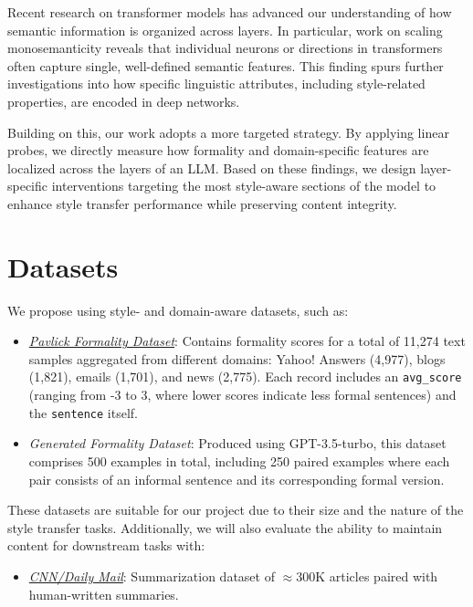 \documentclass[twocolumn]{article}
\begin{document}
Recent research on transformer models has advanced our understanding of how semantic information is organized across layers. In particular, work on scaling monosemanticity \citep{monosemanticity2024} reveals that individual neurons or directions in transformers often capture single, well-defined semantic features. This finding spurs further investigations into how specific linguistic attributes, including style-related properties, are encoded in deep networks.

Building on this, our work adopts a more targeted strategy. By applying linear probes, we directly measure how formality and domain-specific features are localized across the layers of an LLM. Based on these findings, we design layer-specific interventions targeting the most style-aware sections of the model to enhance style transfer performance while preserving content integrity.

\section{Datasets}

We propose using style- and domain-aware datasets, such as:

\begin{itemize}
    \item \href{https://huggingface.co/datasets/osyvokon/pavlick-formality-scores}{\textit{Pavlick Formality Dataset}}: Contains formality scores for a total of 11,274 text samples aggregated from different domains: Yahoo! Answers (4,977), blogs (1,821), emails (1,701), and news (2,775). Each record includes an \texttt{avg\_score} (ranging from -3 to 3, where lower scores indicate less formal sentences) and the \texttt{sentence} itself.
    \item \textit{Generated Formality Dataset}: Produced using GPT-3.5-turbo, this dataset comprises 500 examples in total, including 250 paired examples where each pair consists of an informal sentence and its corresponding formal version.
\end{itemize}

These datasets are suitable for our project due to their size and the nature of the style transfer tasks. Additionally, we will also evaluate the ability to maintain content for downstream tasks with:

\begin{itemize}
    \item \href{https://github.com/abisee/cnn-dailymail}{\textit{CNN/Daily Mail}}: Summarization dataset of $\approx$300K articles paired with human-written summaries.
\end{itemize}
\end{document}
